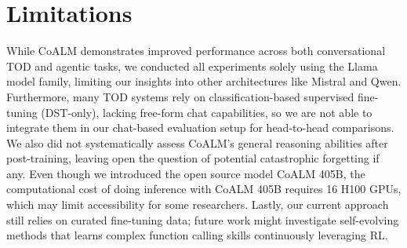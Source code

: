 \section{Limitations}
While CoALM demonstrates improved performance across both conversational TOD and agentic tasks, we conducted all experiments solely using the Llama model family, limiting our insights into other architectures like Mistral and Qwen.
Furthermore, many TOD systems rely on classification-based supervised fine-tuning (DST-only), lacking free-form chat capabilities, so we are not able to integrate them in our chat-based evaluation setup for head-to-head comparisons.
We also did not systematically assess CoALM’s general reasoning abilities after post-training, leaving open the question of potential catastrophic forgetting if any.
Even though we introduced the open source model CoALM 405B, the computational cost of doing inference with CoALM 405B requires 16 H100 GPUs, which may limit accessibility for some researchers. 
Lastly, our current approach still relies on curated fine-tuning data; future work might investigate self-evolving methods that learns complex function calling skills continuously leveraging RL.